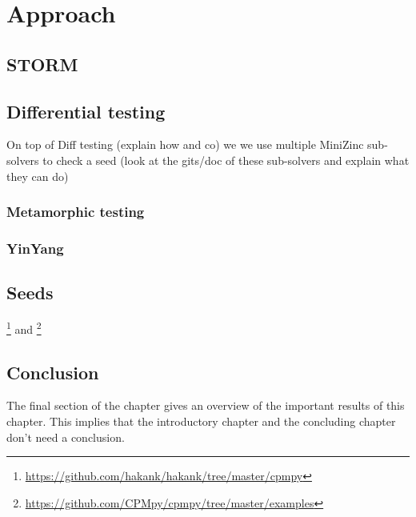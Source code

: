 \chapter{Approach}
\label{cha:v}

\section{STORM}
\section{Differential testing}
On top of Diff testing (explain how and co) we we use multiple MiniZinc sub-solvers to check a seed (look at the gits/doc of these sub-solvers and explain what they can do)
\subsection{Metamorphic testing}
\subsection{YinYang}

\section{Seeds}
\footnote{\url{https://github.com/hakank/hakank/tree/master/cpmpy}} and \cite{18bleukx2022model}
\footnote{\url{https://github.com/CPMpy/cpmpy/tree/master/examples}}

\section{Conclusion}
The final section of the chapter gives an overview of the important results
of this chapter. This implies that the introductory chapter and the
concluding chapter don't need a conclusion.

